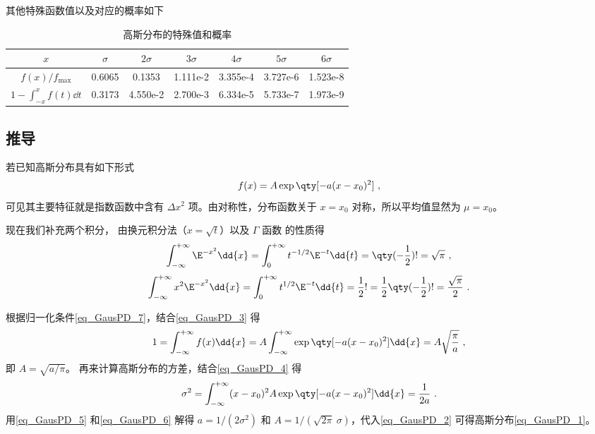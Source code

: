 其他特殊函数值以及对应的概率如下
\begin{table}[ht]
\centering
\caption{高斯分布的特殊值和概率}\label{tab_GausPD1}
\begin{tabular}{|c|c|c|c|c|c|c|}
\hline
$x$ & $\sigma$ & $2\sigma$ & $3\sigma$ & $4\sigma$ & $5\sigma$ & $6\sigma$ \\
\hline
$f(x)/f_\text{max}$ &0.6065 & 0.1353 & 1.111e-2 & 3.355e-4 & 3.727e-6 & 1.523e-8 \\
\hline
$1-\int_{-x}^x f(t)\dd{t}$ & 0.3173 & 4.550e-2 & 2.700e-3 & 6.334e-5 & 5.733e-7 & 1.973e-9 \\
\hline
\end{tabular}
\end{table}

\subsection{推导}
若已知高斯分布具有如下形式
\begin{equation}\label{eq_GausPD_2}
f(x) = A\exp\qty[-a (x - x_0)^2]~,
\end{equation}
可见其主要特征就是指数函数中含有 $\Delta x^2$ 项。由对称性，分布函数关于 $x =x_0$ 对称，所以平均值显然为 $\mu = x_0$。

现在我们补充两个积分， 由换元积分法（$x=\sqrt{t}$）以及 $\Gamma$ 函数 的性质得
\begin{equation}\label{eq_GausPD_3}
\int_{-\infty }^{+\infty } \E^{-x^2}\dd{x}  = \int_0^{+\infty} t^{-1/2}\E^{ - t} \dd{t}  = \qty(-\frac12)! = \sqrt \pi ~,
\end{equation}
\begin{equation}\label{eq_GausPD_4}
\int_{-\infty}^{+\infty} x^2 \E^{-x^2}\dd{x}  = \int_0^{+\infty} t^{1/2}\E^{-t} \dd{t}  = \frac12 ! = \frac12 \qty(-\frac12)! = \frac{\sqrt\pi}{2}~.
\end{equation}

根据归一化条件\autoref{eq_GausPD_7}，结合\autoref{eq_GausPD_3} 得
\begin{equation}\label{eq_GausPD_5}
1 = \int_{-\infty}^{+\infty} f(x) \dd{x}  = A\int_{-\infty}^{+\infty} \exp\qty[-a (x - x_0)^2] \dd{x}  = A\sqrt{\frac{\pi}{a}}~,
\end{equation}
即 $A = \sqrt{a/\pi}$。 再来计算高斯分布的方差，结合\autoref{eq_GausPD_4} 得
\begin{equation}\label{eq_GausPD_6}
\sigma ^2 = \int_{-\infty}^{+\infty} (x - x_0)^2 A\exp\qty[-a (x - x_0)^2] \dd{x}  = \frac{1}{2a}~.
\end{equation}
用\autoref{eq_GausPD_5} 和\autoref{eq_GausPD_6} 解得 $a = 1/(2\sigma^2)$ 和 $A = 1/(\sqrt{2\pi}\ \sigma)$，代入\autoref{eq_GausPD_2} 可得高斯分布\autoref{eq_GausPD_1}。
